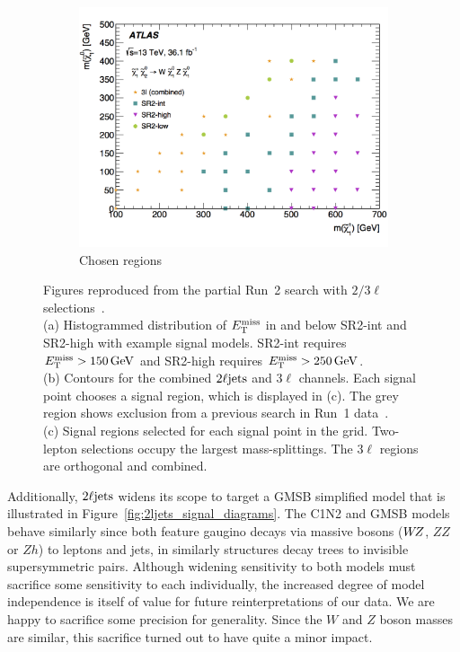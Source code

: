 \begin{figure}[tp]
\begin{subfigure}{0.465\textwidth}
\includegraphics[width=\textwidth]{figures/2ljets_23l_chosen_regions.png}
\caption{Chosen regions}
\end{subfigure}
\caption[
Figures reproduced from the partial Run~2 search with $2/3\ell$ selections
]{%
Figures reproduced from the partial Run~2 search with $2/3\ell$
selections~\cite{atlas_23l_SUSY_2016_24, hepdata.81996}.
\\[0.5em]
(a) Histogrammed distribution of $\met$ in and below SR2-int and SR2-high with
example signal models.
SR2-int requires $\met > 150\,\eV[G]$ and SR2-high requires $\met > 250\,\eV[G]$.
\\[0.5em]
(b) Contours for the combined $\twoljets$ and $3\ell$ channels.
Each signal point chooses a signal region, which is displayed in (c).
The grey region shows exclusion from a previous search in Run~1
data~\cite{atlas_2l_SUSY_2013_11}.
\\[0.5em]
(c) Signal regions selected for each signal point in the grid.
Two-lepton selections occupy the largest mass-splittings.
The $3\ell$ regions are orthogonal and combined.
}
\label{fig:2ljets_23l_stuff}
\end{figure}

Additionally, $\twoljets$ widens its scope to target a GMSB simplified model
that is illustrated in Figure~\ref{fig:2ljets_signal_diagrams}.
The C1N2 and GMSB models behave similarly since both feature gaugino decays via
massive bosons ($W\kern-0.4exZ$, $ZZ$ or $Zh$) to leptons and jets, in
similarly structures decay trees to invisible supersymmetric pairs.
Although widening sensitivity to both models must sacrifice some sensitivity to
each individually, the increased degree of model independence is itself of
value for future reinterpretations of our data.
We are happy to sacrifice some precision for generality.
Since the $W$ and $Z$ boson masses are similar, this sacrifice turned out to
have quite a minor impact.


